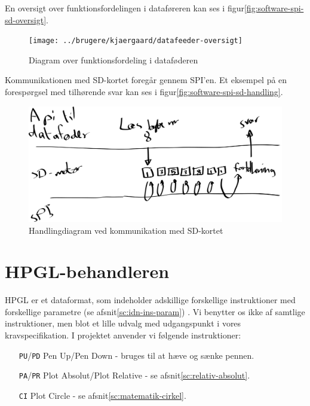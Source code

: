 En oversigt over funktionsfordelingen i
dataføreren kan ses i
figur\vref{fig:software-spi-sd-oversigt}.

\begin{figure}[htbp]
  \centering
  \texttt{[image: ../brugere/kjaergaard/datafeeder-oversigt]}
  \caption{Diagram over funktionsfordeling i dataføderen}
  \label{fig:software-spi-sd-oversigt}
\end{figure}

Kommunikationen med SD-kortet foregår gennem SPI'en. Et eksempel på en forespørgsel med tilhørende svar
kan ses i figur\vref{fig:software-spi-sd-handling}.

\begin{figure}[htbp]
  \centering
  \includegraphics[width=\textwidth]{../brugere/kjaergaard/datafeeder-handling}
  \caption{Handlingdiagram ved kommunikation med SD-kortet}
  \label{fig:software-spi-sd-handling}
\end{figure}


\section{HPGL-behandleren}

HPGL er et dataformat, som indeholder adskillige forskellige
instruktioner med forskellige parametre (se
afsnit\vref{sc:idn-ins-param}) . Vi benytter os ikke af samtlige
instruktioner, men blot et lille udvalg med udgangspunkt i vores
kravspecifikation.  I projektet anvender vi følgende instruktioner:

\begin{itemize} \firmlist
\item[\texttt{PU}/\texttt{PD}] Pen Up/Pen Down - bruges til at hæve og
  sænke pennen.
\item[\texttt{PA}/\texttt{PR}] Plot Absolut/Plot Relative - se
  afsnit\vref{sc:relativ-absolut}.
\item[\texttt{CI}] Plot Circle - se afsnit\vref{sc:matematik-cirkel}.
\end{itemize}

